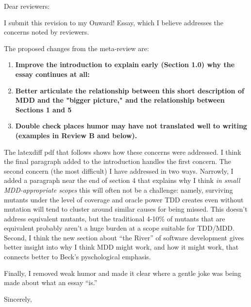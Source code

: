 \documentclass{letter}
\begin{document}
\begin{letter}{}
\opening{Dear reviewers:}

I submit this revision to my Onward! Essay, which I believe addresses the concerns noted by reviewers.

The proposed changes from the meta-review are:

\begin{enumerate}

\item{\bf Improve the introduction to explain early (Section 1.0) why the essay continues at all:}

\item{\bf Better articulate the relationship between this short description of MDD and the "bigger picture," and the relationship between Sections 1 and 5}

\item{\bf Double check places humor may have not translated well to writing (examples in Review B and below).}

\end{enumerate}

The latexdiff pdf that follows shows how these concerns were addressed.  I think the final paragraph added to the introduction handles the first concern.  The second concern (the most difficult) I have addressed in two ways.  Narrowly, I added a paragraph near the end of section 4 that explains why I think \emph{in small MDD-appropriate scopes} this will often not be a challenge:  namely, surviving mutants under the level of coverage and oracle power TDD creates even without mutation will tend to cluster around similar causes for being missed.  This doesn't address equivalent mutants, but the traditional 4-10\% of mutants that are equivalent probably aren't a huge burden at a scope suitable for TDD/MDD.  Second, I think the new section about ``the River'' of software development gives better insight into why I think MDD might work, and how it might work, that connects better to Beck's pyschological emphasis.

Finally, I removed weak humor and made it clear where a gentle joke was being made about what an essay ``is.''

\closing{Sincerely,}



\end{letter}
\end{document}
